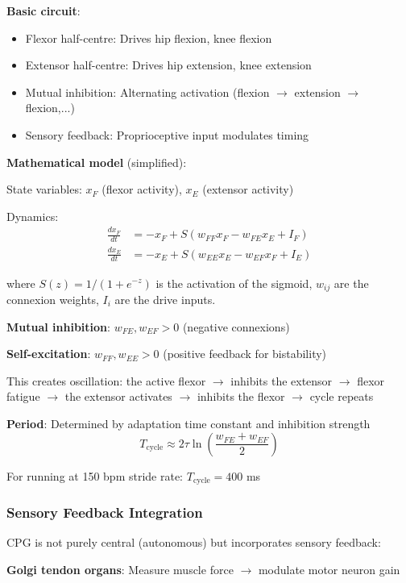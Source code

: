 \documentclass[11pt,onecolumn]{article}
\begin{document}
\textbf{Basic circuit}:
\begin{itemize}
\item Flexor half-centre: Drives hip flexion, knee flexion
\item Extensor half-centre: Drives hip extension, knee extension
\item Mutual inhibition: Alternating activation (flexion $\to$ extension $\to$ flexion,...)
\item Sensory feedback: Proprioceptive input modulates timing
\end{itemize}

\textbf{Mathematical model} (simplified):

State variables: $x_F$ (flexor activity), $x_E$ (extensor activity)

Dynamics:
\begin{align}
\frac{dx_F}{dt} &= -x_F + S(w_{FF}x_F - w_{FE}x_E + I_F) \\
\frac{dx_E}{dt} &= -x_E + S(w_{EE}x_E - w_{EF}x_F + I_E)
\end{align}

where $S(z) = 1/(1 + e^{-z})$ is the activation of the sigmoid, $w_{ij}$ are the connexion weights, $I_i$ are the drive inputs.

\textbf{Mutual inhibition}: $w_{FE}, w_{EF} > 0$ (negative connexions)

\textbf{Self-excitation}: $w_{FF}, w_{EE} > 0$ (positive feedback for bistability)

This creates oscillation: the active flexor $\to$ inhibits the extensor $\to$ flexor fatigue $\to$ the extensor activates $\to$ inhibits the flexor $\to$ cycle repeats

\textbf{Period}: Determined by adaptation time constant and inhibition strength
\begin{equation}
T_{\text{cycle}} \approx 2\tau \ln\left(\frac{w_{FE} + w_{EF}}{2}\right)
\end{equation}

For running at 150 bpm stride rate: $T_{\text{cycle}} = 400$ ms

\subsubsection{Sensory Feedback Integration}

CPG is not purely central (autonomous) but incorporates sensory feedback:

\textbf{Golgi tendon organs}: Measure muscle force $\to$ modulate motor neuron gain
\end{document}
